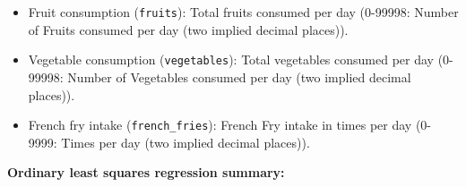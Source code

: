 \documentclass[
]{article}
\providecommand{\tightlist}{%
  \setlength{\itemsep}{0pt}\setlength{\parskip}{0pt}}
\begin{document}
\begin{itemize}
  \begin{itemize}
  \tightlist
  \item
    Fruit consumption (\texttt{fruits}): Total fruits consumed per day (0-99998: Number of Fruits consumed per day (two implied decimal places)).
  \item
    Vegetable consumption (\texttt{vegetables}): Total vegetables consumed per day (0-99998: Number of Vegetables consumed per day (two implied decimal places)).
  \item
    French fry intake (\texttt{french\_fries}): French Fry intake in times per day (0-9999: Times per day (two implied decimal places)).
  \end{itemize}
\end{itemize}

\textbf{Ordinary least squares regression summary:}
\end{document}
